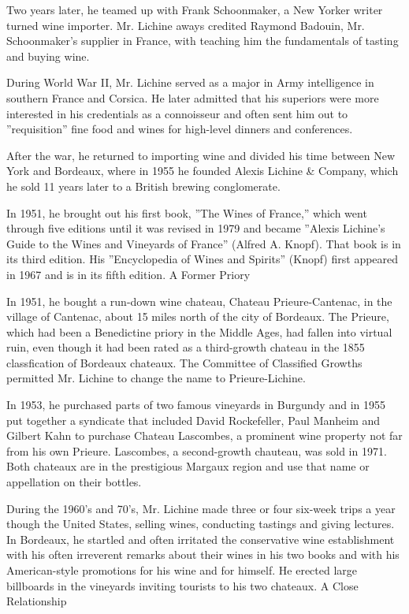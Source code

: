 Two years later, he teamed up with Frank Schoonmaker, a New Yorker
writer turned wine importer. Mr. Lichine aways credited Raymond Badouin,
Mr. Schoonmaker's supplier in France, with teaching him the fundamentals
of tasting and buying wine.

During World War II, Mr. Lichine served as a major in Army intelligence
in southern France and Corsica. He later admitted that his superiors
were more interested in his credentials as a connoisseur and often sent
him out to ''requisition'' fine food and wines for high-level dinners
and conferences.

After the war, he returned to importing wine and divided his time
between New York and Bordeaux, where in 1955 he founded Alexis Lichine
\& Company, which he sold 11 years later to a British brewing
conglomerate.

In 1951, he brought out his first book, ''The Wines of France,'' which
went through five editions until it was revised in 1979 and became
''Alexis Lichine's Guide to the Wines and Vineyards of France'' (Alfred
A. Knopf). That book is in its third edition. His ''Encyclopedia of
Wines and Spirits'' (Knopf) first appeared in 1967 and is in its fifth
edition. A Former Priory

In 1951, he bought a run-down wine chateau, Chateau Prieure-Cantenac, in
the village of Cantenac, about 15 miles north of the city of Bordeaux.
The Prieure, which had been a Benedictine priory in the Middle Ages, had
fallen into virtual ruin, even though it had been rated as a
third-growth chateau in the 1855 classfication of Bordeaux chateaux. The
Committee of Classified Growths permitted Mr. Lichine to change the name
to Prieure-Lichine.

In 1953, he purchased parts of two famous vineyards in Burgundy and in
1955 put together a syndicate that included David Rockefeller, Paul
Manheim and Gilbert Kahn to purchase Chateau Lascombes, a prominent wine
property not far from his own Prieure. Lascombes, a second-growth
chauteau, was sold in 1971. Both chateaux are in the prestigious Margaux
region and use that name or appellation on their bottles.

During the 1960's and 70's, Mr. Lichine made three or four six-week
trips a year though the United States, selling wines, conducting
tastings and giving lectures. In Bordeaux, he startled and often
irritated the conservative wine establishment with his often irreverent
remarks about their wines in his two books and with his American-style
promotions for his wine and for himself. He erected large billboards in
the vineyards inviting tourists to his two chateaux. A Close
Relationship

